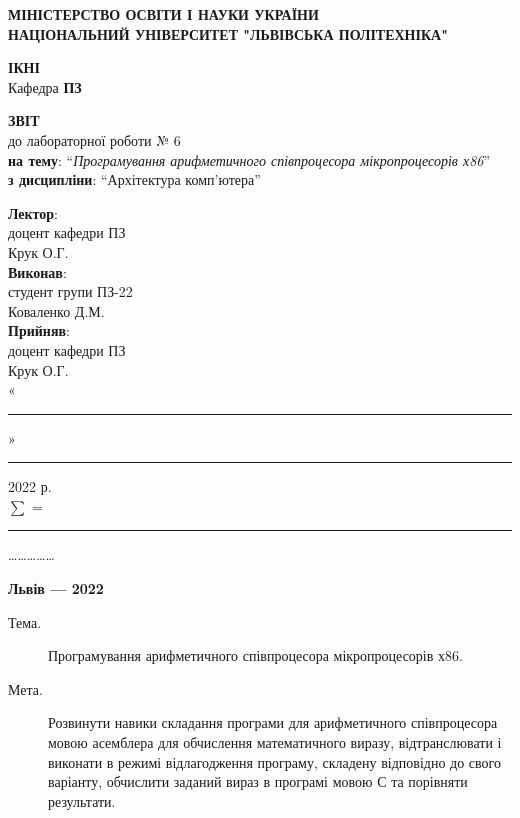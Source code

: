 \documentclass{article}
\newcommand\subject{Архітектура комп'ютера}
\newcommand\lecturer{доцент кафедри ПЗ\\Крук О.Г.}
\newcommand\teacher{доцент кафедри ПЗ\\Крук О.Г.}
\newcommand\mygroup{ПЗ-22}
\newcommand\lab{6}
\newcommand\theme{Програмування арифметичного співпроцесора мікропроцесорів х86}
\newcommand\purpose{Розвинути навики складання програми для арифметичного співпроцесора мовою асемблера для обчислення математичного виразу, відтранслювати і виконати в режимі відлагодження програму, складену відповідно до свого варіанту, обчислити заданий вираз в програмі мовою С та порівняти результати}
\begin{document}
	\begin{normalsize}
		\begin{titlepage}
			\thispagestyle{empty}
			\begin{center}
				\textbf{МІНІСТЕРСТВО ОСВІТИ І НАУКИ УКРАЇНИ\\
					НАЦІОНАЛЬНИЙ УНІВЕРСИТЕТ "ЛЬВІВСЬКА ПОЛІТЕХНІКА"}
			\end{center}
			\begin{flushright}
				\textbf{ІКНІ}\\
				Кафедра \textbf{ПЗ}
			\end{flushright}
			\vspace{200pt}
			\begin{center}
				\textbf{ЗВІТ}\\
				\vspace{10pt}
				до лабораторної роботи № \lab\\
				\textbf{на тему}: “\textit{\theme}”\\
				\textbf{з дисципліни}: “\subject”
			\end{center}
			\vspace{112pt}
			\begin{flushright}
				
				\textbf{Лектор}:\\
				\lecturer\\
				\vspace{28pt}
				\textbf{Виконав}:\\
				
				студент групи \mygroup\\
				Коваленко Д.М.\\
				\vspace{28pt}
				\textbf{Прийняв}:\\
				
				\teacher\\
				
				\vspace{28pt}
				«\rule{1cm}{0.15mm}» \rule{1.5cm}{0.15mm} 2022 р.\\
				$\sum$ = \rule{1cm}{0.15mm}……………\\
				
			\end{flushright}
			\vspace{\fill}
			\begin{center}
				\textbf{Львів — 2022}
			\end{center}
		\end{titlepage}
		
		\begin{description}
			\item[Тема.] \theme.
			\item[Мета.] \purpose.
		\end{description}
		

\end{normalsize}
\end{document}
